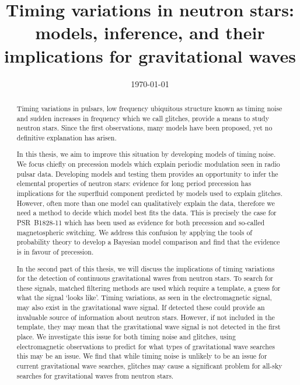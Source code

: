 \documentclass[twoside, 11pt]{thesis}
\begin{document}
\def\biblio{}

\frontmatter
\title      {Timing variations in neutron stars: models, inference, and their
             implications for gravitational waves}
\date       {\today}
\subject    {}
\keywords   {}
\maketitle

\begin{abstract}

Timing variations in pulsars, low frequency ubiquitous structure known as
timing noise and sudden increases in frequency which we call glitches, provide
a means to study neutron stars. Since the first observations, many models have
been proposed, yet no definitive explanation has arisen.

In this thesis, we aim to improve this situation by developing models of timing
noise. We focus chiefly on precession models which explain periodic
modulation seen in radio pulsar data.
Developing models and testing them provides an opportunity to infer the
elemental properties of neutron stars: evidence for long period precession has
implications for the superfluid component predicted by models used to explain
glitches. However, often more than one model can
qualitatively explain the data, therefore we need a method to decide which
model best fits the data. This is precisely the case for
PSR~B1828-11 which has been used as evidence for both precession
and so-called magnetospheric switching. We address this confusion by applying the tools of
probability theory to develop a Bayesian model comparison and
find that the evidence is in favour of precession.

In the second part of this thesis, we will discuss the implications of timing
variations for the detection of continuous gravitational waves from neutron
stars. To search for these signals, matched filtering methods are used which
require a template, a guess for what the signal `looks like'. Timing
variations, as seen in the electromagnetic signal, may also exist in the
gravitational wave signal. If detected these could provide an invaluable source
of information about neutron stars. However, if not included in the template,
they may mean that the gravitational wave signal is not detected in the first
place. We investigate this issue for both timing noise and glitches, using
electromagnetic observations to predict for what types of gravitational wave
searches this may be an issue. We find that while timing noise is unlikely to
be an issue for current gravitational wave searches, glitches may cause a significant problem for
all-sky searches for gravitational waves from neutron stars.

\end{abstract}
\end{document}
